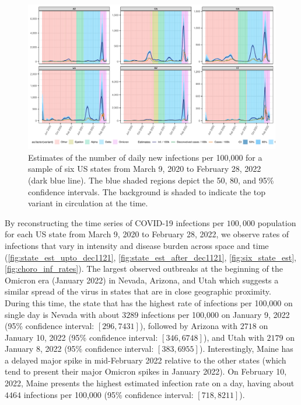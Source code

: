\documentclass{article}
\begin{document}
\begin{figure}[!tb]
\centering
    \includegraphics[width=.9\linewidth]{state_niauc_est_6states.pdf}
    \caption{Estimates of the number of daily new infections per 100,000 for a
    sample of six US states from March 9, 2020 to February 28, 2022 (dark blue
    line). The blue shaded regions depict the 50, 80, and 95\% confidence
    intervals. The background is shaded to indicate the top variant in
    circulation at the time.}
    \label{fig:six_state_est}
\end{figure}

By reconstructing the time series of COVID-19 infections per $100,000$
population for each US state from March 9, 2020 to February 28, 2022, we observe
rates of infections that vary in intensity and disease burden across space and
time (\autoref{fig:state_est_upto_dec1121}, \autoref{fig:state_est_after_dec1121},
 \autoref{fig:six_state_est}, \autoref{fig:choro_inf_rates}). The
largest observed outbreaks at the beginning of the Omicron era (January
2022) in Nevada, Arizona, and Utah which suggests a similar spread of the virus in
states that are in close geographic proximity. During this time, the state that
has the highest rate of infections per 100,000 on single day is Nevada with
about $3289$ infections per 100,000 on January 9, 2022 (95\% confidence interval:
$[296, 7431]$), followed by Arizona with $2718$ on January 10, 2022 (95\%
confidence interval: $[346, 6748]$), and Utah with $2179$ on January 8, 2022
(95\% confidence interval: $[383, 6955]$).
Interestingly, Maine has a delayed major spike in mid-February 2022 relative to 
the other states (which tend to present their major Omicron spikes in January 2022).
On February 10, 2022, Maine presents the highest estimated infection rate on a day, 
having about $4464$ infections per 100,000 (95\% confidence interval: $[718, 8211]$).
\end{document}
